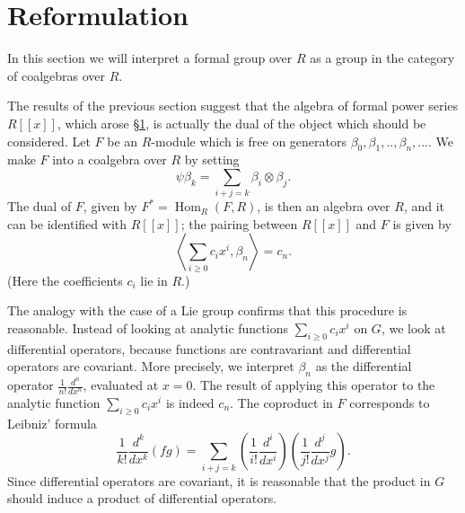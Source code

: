 \documentclass[../main]{subfiles}
\begin{document}
\label{sec:p2c3}

\chapter{Reformulation}

In this section we will interpret a formal group over $R$ as a group in the category of coalgebras over $R$.

The results of the previous section suggest that the algebra of formal power series $R[[x]]$, which arose \hyperref[sec:p2c1]{\S 1}, is actually the dual of the object which should be considered. Let $F$ be an $R$-module which is free on generators $\beta_0,\beta_1,..,\beta_n,...$. We make $F$ into a coalgebra over $R$ by setting
\begin{equation}
\label{eqn:p2c03.1}
\tag{3.1}
\psi\beta_k=\sum_{i+j=k}\beta_i\otimes\beta_j.
\end{equation}
The dual of $F$, given by $F^\ast=\operatorname{Hom}_R(F,R)$, is then an algebra over $R$, and it can be identified with $R[[x]]$; the pairing between $R[[x]]$ and $F$ is given by 
\begin{equation}
\label{eqn:p2c03.2}
\tag{3.2}
\left<\sum_{i\geq 0}c_ix^i,\beta_n\right>=c_n.    
\end{equation}
(Here the coefficients $c_i$ lie in $R$.)

The analogy with the case of a Lie group confirms that this procedure is reasonable. Instead of looking at analytic functions $\sum_{i\geq 0}c_ix^i$ on $G$, we look at differential operators, because functions are contravariant and differential operators are covariant. More precisely, we interpret $\beta_n$ as the differential operator $\frac{1}{n!}\frac{d^n}{dx^n}$, evaluated at $x=0$. The result of applying this operator to the analytic function $\sum_{i\geq 0}c_ix^i$ is indeed $c_n$. The coproduct in $F$ corresponds to Leibniz' formula
$$\frac{1}{k!}\frac{d^k}{dx^k}(fg)=\sum_{i+j=k}\left(\frac{1}{i!}\frac{d^i}{dx^i}\right)\left(\frac{1}{j!}\frac{d^j}{dx^j}g\right).$$
Since differential operators are covariant, it is reasonable that the product in $G$ should induce a product of differential operators. 
\end{document}
